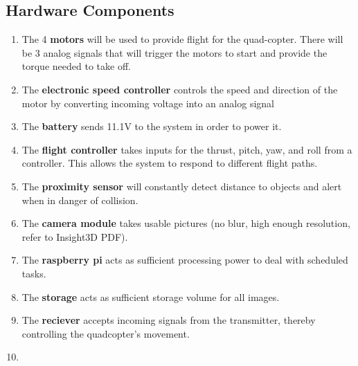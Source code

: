 \documentclass[10pt,letterpaper]{article}
\begin{document}
\subsection{Hardware Components}
	\begin{enumerate}[label=\textbf{HC\arabic*}]
		\item The 4 \textbf{motors} will be used to provide flight for the quad-copter. There will be 3 analog signals that will trigger the motors to start and provide the torque needed to take off.\\
      
    	\item The \textbf{electronic speed controller} controls the speed and direction of the motor by converting incoming voltage  into an analog signal\\
    
    	\item The \textbf{battery} sends 11.1V to the system in order to power it.  \\
        
        \item The \textbf{flight controller} takes inputs for the thrust, pitch, yaw, and roll from a controller. This allows the system to respond to different flight paths.
        
        \item The \textbf{proximity sensor} will constantly detect distance to objects and alert when in danger of collision.
        
        \item The \textbf{camera module} takes usable pictures (no blur, high enough resolution, refer to Insight3D PDF).
        
        \item The \textbf{raspberry pi} acts as sufficient processing power to deal with scheduled tasks.
        
        \item The \textbf{storage} acts as sufficient storage volume for all images.
        
        \item The \textbf{reciever} accepts incoming signals from the transmitter, thereby controlling the quadcopter's movement.
        
        \item 
    
    \end{enumerate}


\newpage
\end{document}

